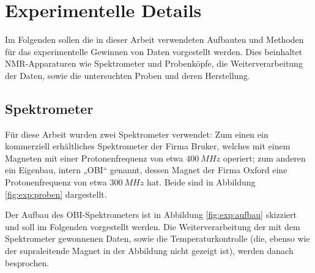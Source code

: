 \chapter{Experimentelle Details} \label{chapter:exp_details}

Im Folgenden sollen die in dieser Arbeit verwendeten Aufbauten und Methoden für das experimentelle Gewinnen von Daten vorgestellt werden. Dies beinhaltet NMR-Apparaturen wie Spektrometer und Probenköpfe, die Weiterverarbeitung der Daten, sowie die untersuchten Proben und deren Herstellung.

\section{Spektrometer} \label{section:exp:spektrometer}

Für diese Arbeit wurden zwei Spektrometer verwendet: Zum einen ein kommerziell erhältliches Spektrometer der Firma Bruker, welches mit einem Magneten mit einer Protonenfrequenz von etwa $\SI{400}{MHz}$ operiert; zum anderen ein Eigenbau, intern „OBI“ genannt, dessen Magnet der Firma Oxford eine Protonenfrequenz von etwa $\SI{300}{MHz}$ hat. Beide sind in Abbildung \ref{fig:exp:proben} dargestellt.

Der Aufbau des OBI-Spektrometers ist in Abbildung \ref{fig:exp:aufbau} skizziert und soll im Folgenden vorgestellt werden. Die Weiterverarbeitung der mit dem Spektrometer gewonnenen Daten, sowie die Temperaturkontrolle (die, ebenso wie der supraleitende Magnet in der Abbildung nicht gezeigt ist), werden danach besprochen.

